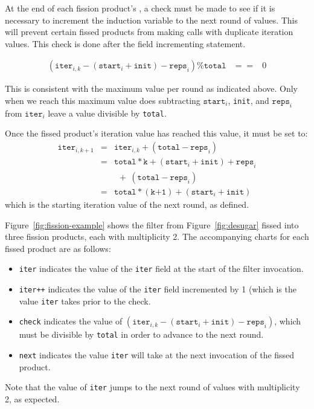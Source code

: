 At the end of each fission product's \work, a check must be made to
see if it is necessary to increment the induction variable to the next
round of values.  This will prevent certain fissed products from
making calls with duplicate iteration values.  This check is done
after the field incrementing statement.

\begin{eqnarray*}
(\texttt{iter}_{i,k} - (\texttt{start}_i + \texttt{init}) - \texttt{reps}_i) \% \texttt{total} &==& 0
\end{eqnarray*}

This is consistent with the maximum value per round as
indicated above.  Only when we reach this maximum value does subtracting 
$\texttt{start}_i$, \texttt{init}, and $\texttt{reps}_i$ from $\texttt{iter}_i$ leave a value divisible by
\texttt{total}.

Once the fissed product's iteration value has reached
this value, it must be set to:
\begin{eqnarray*}
\texttt{iter}_{i,k+1} &=& \texttt{iter}_{i,k} + (\texttt{total} - \texttt{reps}_i) \\
&=& \texttt{total}*\texttt{k} + (\texttt{start}_i + \texttt{init}) + \texttt{reps}_i \\
&&  \ \ +\ (\texttt{total} - \texttt{reps}_i) \\
&=& \texttt{total}*(\texttt{k+1}) + (\texttt{start}_i + \texttt{init})
\end{eqnarray*}
which is the starting iteration value of the next round, as defined.

Figure~\ref{fig:fission-example} shows the filter from Figure~\ref{fig:desugar} fissed into three fission products, each with multiplicity 2.  The accompanying charts for each fissed product are as follows:
\begin{itemize}
\item{\tt iter} indicates the value of the {\tt iter} field at the start of the filter invocation.  
\item{\tt iter++} indicates the value of the {\tt iter} field incremented by 1 (which is the value {\tt iter} takes prior to the check.  
\item{\tt check} indicates the value of $(\texttt{iter}_{i,k} - (\texttt{start}_i + \texttt{init}) - \texttt{reps}_i)$, which must be divisible by {\tt total} in order to advance to the next round.  
\item{\tt next} indicates the value {\tt iter} will take at the next invocation of the fissed product.
\end{itemize}
Note that the value of \texttt{iter} jumps to the next round of values with multiplicity 2, as expected.

